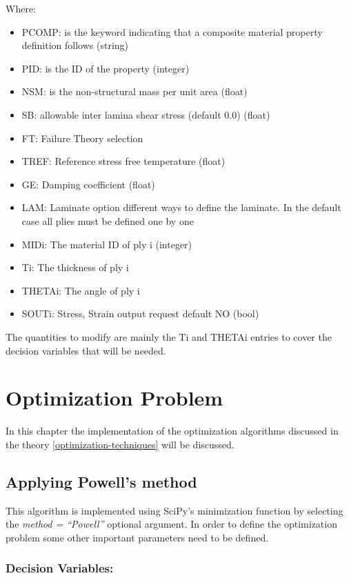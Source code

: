 Where:

\begin{itemize}
\item
  PCOMP: is the keyword indicating that a composite material property
  definition follows (string)
\item
  PID: is the ID of the property (integer)
\item
  NSM: is the non-structural mass per unit area (float)
\item
  SB: allowable inter lamina shear stress (default 0.0) (float)
\item
  FT: Failure Theory selection
\item
  TREF: Reference stress free temperature (float)
\item
  GE: Damping coefficient (float)
\item
  LAM: Laminate option different ways to define the laminate. In the
  default case all plies must be defined one by one
\item
  MIDi: The material ID of ply i (integer)
\item
  Ti: The thickness of ply i
\item
  THETAi: The angle of ply i
\item
  SOUTi: Stress, Strain output request default NO (bool)
\end{itemize}

The quantities to modify are mainly the Ti and THETAi entries to cover
the decision variables that will be needed.

\section{Optimization Problem}\label{optimization-problem}

In this chapter the implementation of the optimization algorithms
discussed in the theory \autoref{optimization-techniques} will be discussed.

\subsection{Applying Powell's method}\label{applying-powells-method}

This algorithm is implemented using SciPy's \cite{2020SciPy-NMeth} minimization
function by selecting the \emph{method = ``Powell''} optional argument.
In order to define the optimization problem some other important
parameters need to be defined.

\subsubsection{Decision Variables:}

